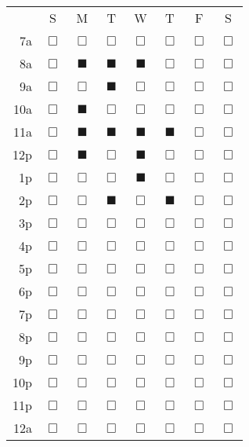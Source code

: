 \begin{tabular}{rccccccc}
     & S & M & T & W & T & F & S \\
7a & $\Box$ & $\Box$ & $\Box$ & $\Box$ & $\Box$ & $\Box$ & $\Box$ \\
8a & $\Box$ & $\blacksquare$ & $\blacksquare$ & $\blacksquare$ & $\Box$ & $\Box$ & $\Box$ \\
9a & $\Box$ & $\Box$ & $\blacksquare$ & $\Box$ & $\Box$ & $\Box$ & $\Box$ \\
10a & $\Box$ & $\blacksquare$ & $\Box$ & $\Box$ & $\Box$ & $\Box$ & $\Box$ \\
11a & $\Box$ & $\blacksquare$ & $\blacksquare$ & $\blacksquare$ & $\blacksquare$ & $\Box$ & $\Box$ \\
12p & $\Box$ & $\blacksquare$ & $\Box$ & $\blacksquare$ & $\Box$ & $\Box$ & $\Box$ \\
1p & $\Box$ & $\Box$ & $\Box$ & $\blacksquare$ & $\Box$ & $\Box$ & $\Box$ \\
2p & $\Box$ & $\Box$ & $\blacksquare$ & $\Box$ & $\blacksquare$ & $\Box$ & $\Box$ \\
3p & $\Box$ & $\Box$ & $\Box$ & $\Box$ & $\Box$ & $\Box$ & $\Box$ \\
4p & $\Box$ & $\Box$ & $\Box$ & $\Box$ & $\Box$ & $\Box$ & $\Box$ \\
5p & $\Box$ & $\Box$ & $\Box$ & $\Box$ & $\Box$ & $\Box$ & $\Box$ \\
6p & $\Box$ & $\Box$ & $\Box$ & $\Box$ & $\Box$ & $\Box$ & $\Box$ \\
7p & $\Box$ & $\Box$ & $\Box$ & $\Box$ & $\Box$ & $\Box$ & $\Box$ \\
8p & $\Box$ & $\Box$ & $\Box$ & $\Box$ & $\Box$ & $\Box$ & $\Box$ \\
9p & $\Box$ & $\Box$ & $\Box$ & $\Box$ & $\Box$ & $\Box$ & $\Box$ \\
10p & $\Box$ & $\Box$ & $\Box$ & $\Box$ & $\Box$ & $\Box$ & $\Box$ \\
11p & $\Box$ & $\Box$ & $\Box$ & $\Box$ & $\Box$ & $\Box$ & $\Box$ \\
12a & $\Box$ & $\Box$ & $\Box$ & $\Box$ & $\Box$ & $\Box$ & $\Box$
\end{tabular}